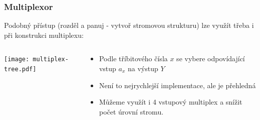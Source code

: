 \documentclass{beamer}
\begin{document}
\begin{frame}
\frametitle{Multiplexor}

Podobný přístup (rozděl a panuj - vytvoř stromovou strukturu) lze využít třeba i při konstrukci multiplexu:
\begin{columns}
\begin{column}{0.5\textwidth}
\begin{center}
   \texttt{[image: multiplex-tree.pdf]}
\end{center}
\end{column}
\begin{column}{0.5\textwidth}
\begin{itemize}
\item Podle tříbitového čísla $x$ se vybere odpovídající vstup $a_x$ na výstup $Y$
\item Není to nejrychlejší implementace, ale je přehledná
\item Můžeme využít i 4 vstupový multiplex a snížit počet úrovní stromu.
\end{itemize}

\end{column}
\end{columns}

\end{frame}
\end{document}

